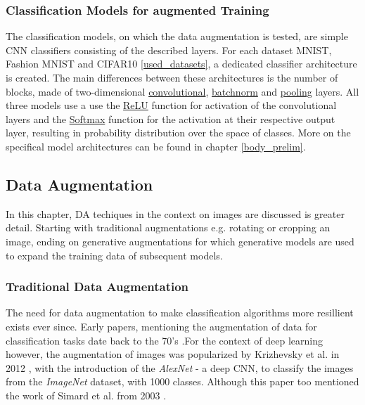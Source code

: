 \subsubsection{Classification Models for augmented Training}
The classification models, on which the data augmentation is tested, are simple CNN classifiers consisting of the described layers. For each dataset MNIST, Fashion MNIST and CIFAR10 \ref{used_datasets}, a dedicated classifier architecture is created. The main differences between these architectures is the number of blocks, made of two-dimensional \hyperref[theoretical_classification_conv_layers]{convolutional}, \hyperref[theoretical_classification_batchnorm_layers]{batchnorm} and \hyperref[theoretical_classification_pooling_layers]{pooling} layers. All three models use a use the \hyperref[theoretical_activations_relu]{ReLU} function for activation of the convolutional layers and the \hyperref[theoretical_activations_softmax]{Softmax} function for the activation at their respective output layer, resulting in probability distribution over the space of classes. More on the specifical model architectures can be found in chapter \ref{body_prelim}. %


\subsection[Data Augmentation - DA]{Data Augmentation}\label{theoretical_da}
In this chapter, DA techiques in the context on images are discussed is greater detail. Starting with traditional augmentations e.g. rotating or cropping an image, ending on generative augmentations for which generative models are used to expand the training data of subsequent models.

\subsubsection[Traditional Data Augmentation - TDA]{Traditional Data Augmentation}\label{theoretical_tda}
The need for data augmentation to make classification algorithms more resillient exists ever since. Early papers, mentioning the augmentation of data for classification tasks date back to the 70's \cite{Nagy1966}.For the context of deep learning however, the augmentation of images was popularized by Krizhevsky et al. in 2012 \cite{Krizhevsky2012traditionaldataaugmentation}, with the introduction of the \textit{AlexNet} - a deep CNN, to classify the images from the \textit{ImageNet} \cite{ImageNetDataset5206848} dataset, with 1000 classes. Although this paper too mentioned the work of Simard et al. from 2003 \cite{Simard2003bestpracticesforcnns}.

